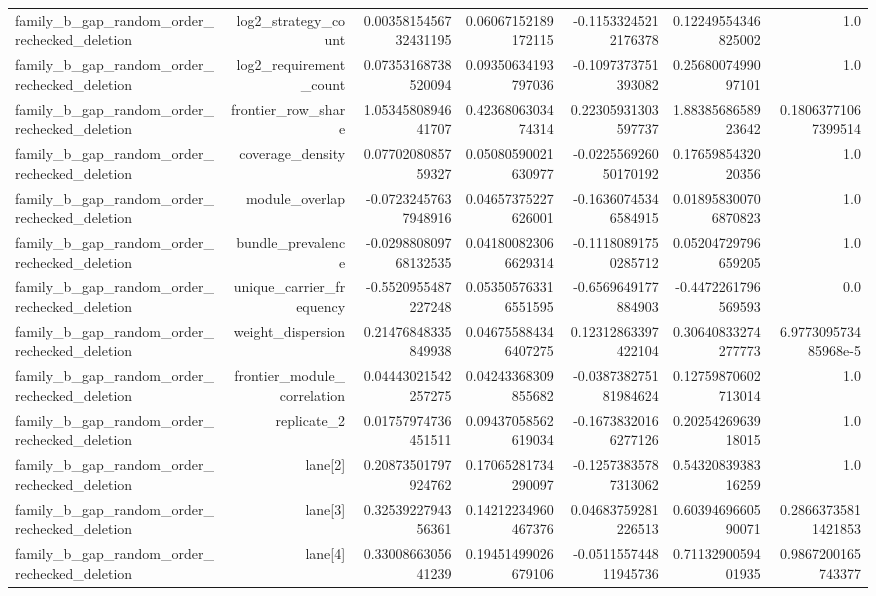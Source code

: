 {\begin{longtable}{lrrrrrr}
family\_b\_gap\_random\_order\_rechecked\_deletion & log2\_strategy\_count & 0.0035815456732431195 & 0.06067152189172115 & -0.11533245212176378 & 0.12249554346825002 & 1.0 \\
family\_b\_gap\_random\_order\_rechecked\_deletion & log2\_requirement\_count & 0.07353168738520094 & 0.09350634193797036 & -0.1097373751393082 & 0.2568007499097101 & 1.0 \\
family\_b\_gap\_random\_order\_rechecked\_deletion & frontier\_row\_share & 1.0534580894641707 & 0.4236806303474314 & 0.22305931303597737 & 1.8838568658923642 & 0.18063771067399514 \\
family\_b\_gap\_random\_order\_rechecked\_deletion & coverage\_density & 0.0770208085759327 & 0.05080590021630977 & -0.022556926050170192 & 0.1765985432020356 & 1.0 \\
family\_b\_gap\_random\_order\_rechecked\_deletion & module\_overlap & -0.07232457637948916 & 0.04657375227626001 & -0.16360745346584915 & 0.018958300706870823 & 1.0 \\
family\_b\_gap\_random\_order\_rechecked\_deletion & bundle\_prevalence & -0.029880809768132535 & 0.041800823066629314 & -0.11180891750285712 & 0.05204729796659205 & 1.0 \\
family\_b\_gap\_random\_order\_rechecked\_deletion & unique\_carrier\_frequency & -0.5520955487227248 & 0.053505763316551595 & -0.6569649177884903 & -0.4472261796569593 & 0.0 \\
family\_b\_gap\_random\_order\_rechecked\_deletion & weight\_dispersion & 0.21476848335849938 & 0.046755884346407275 & 0.12312863397422104 & 0.30640833274277773 & 6.977309573485968e-5 \\
family\_b\_gap\_random\_order\_rechecked\_deletion & frontier\_module\_correlation & 0.04443021542257275 & 0.04243368309855682 & -0.038738275181984624 & 0.12759870602713014 & 1.0 \\
family\_b\_gap\_random\_order\_rechecked\_deletion & replicate\_2 & 0.01757974736451511 & 0.09437058562619034 & -0.16738320166277126 & 0.2025426963918015 & 1.0 \\
family\_b\_gap\_random\_order\_rechecked\_deletion & lane[2] & 0.20873501797924762 & 0.17065281734290097 & -0.12573835787313062 & 0.5432083938316259 & 1.0 \\
family\_b\_gap\_random\_order\_rechecked\_deletion & lane[3] & 0.3253922794356361 & 0.14212234960467376 & 0.04683759281226513 & 0.6039469660590071 & 0.28663735811421853 \\
family\_b\_gap\_random\_order\_rechecked\_deletion & lane[4] & 0.3300866305641239 & 0.19451499026679106 & -0.051155744811945736 & 0.7113290059401935 & 0.9867200165743377 \\

\end{longtable}}
